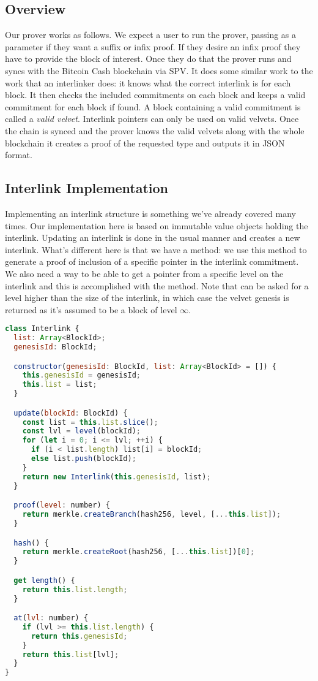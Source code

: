 \subsection{Overview}
Our prover works as follows. We expect a user to run the prover, passing as a parameter if they want a suffix or infix proof. If they desire an infix proof they have to provide the block of interest. Once they do that the prover runs and syncs with the Bitcoin Cash blockchain via SPV. It does some similar work to the work that an interlinker does: it knows what the correct interlink is for each block. It then checks the included commitments on each block and keeps a valid commitment for each block if found. A block containing a valid commitment is called a \emph{valid velvet}. Interlink pointers can only be used on valid velvets. Once the chain is synced and the prover knows the valid velvets along with the whole blockchain it creates a proof of the requested type and outputs it in JSON format.

\subsection{Interlink Implementation}
Implementing an interlink structure is something we've already covered many times. Our implementation here is based on immutable value objects holding the interlink. Updating an interlink is done in the usual manner and creates a new interlink. What's different here is that we have a  method: we use this method to generate a proof of inclusion of a specific pointer in the interlink commitment. We also need a way to be able to get a pointer from a specific level on the interlink and this is accomplished with the  method. Note that  can be asked for a level higher than the size of the interlink, in which case the velvet genesis is returned as it's assumed to be a block of level $\infty$.

\begin{lstlisting}[language=Javascript]
class Interlink {
  list: Array<BlockId>;
  genesisId: BlockId;

  constructor(genesisId: BlockId, list: Array<BlockId> = []) {
    this.genesisId = genesisId;
    this.list = list;
  }

  update(blockId: BlockId) {
    const list = this.list.slice();
    const lvl = level(blockId);
    for (let i = 0; i <= lvl; ++i) {
      if (i < list.length) list[i] = blockId;
      else list.push(blockId);
    }
    return new Interlink(this.genesisId, list);
  }

  proof(level: number) {
    return merkle.createBranch(hash256, level, [...this.list]);
  }

  hash() {
    return merkle.createRoot(hash256, [...this.list])[0];
  }

  get length() {
    return this.list.length;
  }

  at(lvl: number) {
    if (lvl >= this.list.length) {
      return this.genesisId;
    }
    return this.list[lvl];
  }
}
\end{lstlisting}

